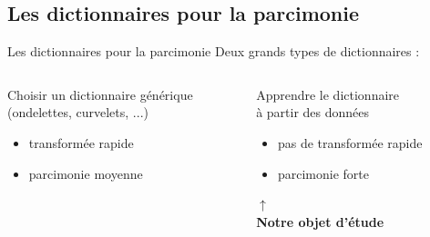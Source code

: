 \subsection{Les dictionnaires pour la parcimonie}
\begin{frame}{Les dictionnaires pour la parcimonie}
Deux grands types de dictionnaires :
\begin{columns}[t]
\begin{column}{0.49\textwidth}
	\begin{block}{}
	Choisir un dictionnaire \alert{générique}\\
	(ondelettes, curvelets, ...)
	\begin{itemize}
	\item[\textcolor{green2}{\cmark}] transformée rapide
	\item[\textcolor{red}{\xmark}] parcimonie moyenne
	\end{itemize}
	\end{block}
\end{column}
\begin{column}{0.49\textwidth}
	\begin{block}{}
	\alert{Apprendre} le dictionnaire\\
	à partir des données
	\begin{itemize}
	\item[\textcolor{red}{\xmark}] pas de transformée rapide
	\item[\textcolor{green2}{\cmark}] parcimonie forte
	\end{itemize}
	\end{block}
	\begin{tightcenter}
		\alert{$\uparrow$}\\
		\textbf{Notre objet d'étude}
	\end{tightcenter}
\end{column}
\end{columns}


\end{frame}

